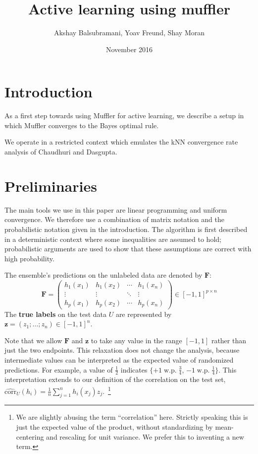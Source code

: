 \documentclass{article}
\title{Active learning using muffler}
\author{Akshay Balsubramani, Yoav Freund, Shay Moran}
\date{November 2016}
\newcommand{\corr}{\mbox{corr}}
\newcommand{\vF}{\mathbf{F}}
\newcommand{\vz}{\mathbf{z}}
\begin{document}
\maketitle

\section{Introduction}

As a first step towards using Muffler for active learning, we describe
a setup in which Muffler converges to the Bayes optimal rule.

We operate in a restricted context which emulates the kNN 
convergence rate analysis of Chaudhuri and Dasgupta.

\section{Preliminaries}
\label{sec:setup}

The main tools we use in this paper are linear programming and uniform
convergence. We therefore use a combination of matrix notation and
the probabilistic notation given in the introduction. 
The algorithm is first described in a deterministic context where some inequalities are assumed to hold; probabilistic
arguments are used to show that these assumptions are correct with high probability.

The ensemble's predictions on the unlabeled data are denoted by $\vF$:
\begin{equation}
\vF = 
 \begin{pmatrix}
   h_1(x_1) & h_1(x_2) & \cdots & h_1 (x_n) \\
   \vdots   & \vdots    & \ddots &  \vdots  \\
   h_p(x_1)  &  h_p (x_2)  & \cdots &  h_p (x_n)
 \end{pmatrix}
 \in [-1, 1]^{p \times n}
\end{equation}
The \textbf{true labels} on the test data $U$ are represented by $\vz
= (z_1; \dots; z_n) \in [-1,1]^n$.

Note that we allow $\vF$ and $\vz$ to
take any value in the range $[-1, 1]$ rather than just the two
endpoints. This relaxation does not change the analysis, because intermediate
values can be interpreted as the expected value of randomized
predictions.  For example, a value of $\frac{1}{2}$ indicates $\{+1\;
\text{w.p.}\; \frac{3}{4} $, $-1\; \text{w.p.}\; \frac{1}{4} \}$. This
interpretation extends to our definition of the correlation
on the test set,
$\widehat{\corr}_{U} (h_i) = \frac{1}{n} \sum_{j=1}^n h_i (x_j) z_j$.~\footnote{We are slightly abusing the
  term ``correlation'' here. Strictly speaking this is just the expected
  value of the product, without standardizing by mean-centering and rescaling for unit variance. 
  We prefer this to inventing a new term.}
\end{document}
